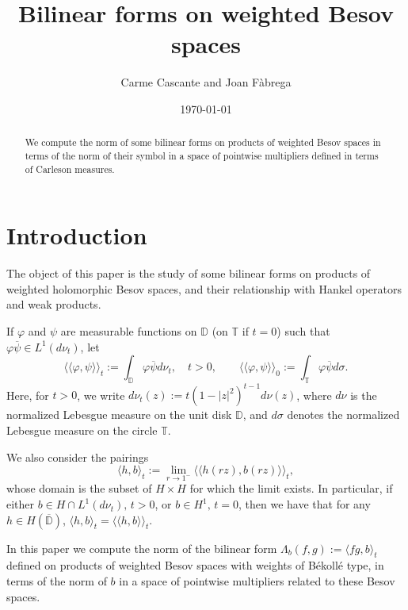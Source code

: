 \documentclass[12pt,twoside,leqno,final]{amsart}
\title{Bilinear forms on  weighted Besov spaces}
\author{Carme Cascante and Joan F\`abrega}
\date{\today}
\theoremstyle{plain}
\begin{document}
\begin{abstract} 
We compute the norm of some bilinear forms on products of weighted Besov spaces 
in terms of the norm of their symbol in a space of pointwise multipliers 
defined in terms of Carleson measures.
\end{abstract}

\maketitle

\section{Introduction}\label{sec:intro}
The object of this paper is the study of some bilinear forms on products of 
weighted holomorphic Besov spaces, and their  relationship with Hankel operators and weak products.

If $\varphi$ and $\psi$ are measurable functions on ${{\mathbb D}}$ (on ${{\mathbb T}}$ if $t=0$) 
such that $\varphi\overline{\psi}\in L^1(d\nu_t)$, let 
\begin{equation}\label{eqn:pars}
\langle\langle \varphi,\psi\rangle\rangle_t
:=\int_{{\mathbb D}} \varphi\overline \psi d\nu_t,\quad t>0,\qquad \langle\langle
 \varphi,\psi\rangle\rangle_0
:=\int_{{\mathbb T}} \varphi\overline \psi d\sigma.
\end{equation}
Here, for $t>0$, we write $d\nu_t(z):= t (1-|z|^2)^{t-1}d\nu(z)$, where $d\nu$ is 
the normalized Lebesgue measure on the unit disk ${{\mathbb D}}$, and $d\sigma$ 
denotes the normalized Lebesgue measure on the circle ${{\mathbb T}}$.

We also consider the pairings 
\begin{equation}\label{eqn:parw}
\langle h,b\rangle_t:=\lim_{r\to 1^{-}}\langle\langle h(rz), b(rz)\rangle\rangle_t,
\end{equation}
whose domain is the subset of $H\times H$ for which the limit exists.
In particular, if either $b\in H\cap L^1(d\nu_t),\,t>0$, or $b\in H^1,\,t=0$, then we have that for any $h\in H(\overline{{\mathbb D}})$, 
$\langle h,b\rangle_t=\langle\langle h,b\rangle\rangle_t$.

In this paper we compute the norm of the bilinear form $\Lambda_b(f,g):=\langle fg,b\rangle_t$  
defined on products of weighted Besov spaces with weights of B\'ekoll\'e type,
in terms of the norm of $b$ in a space of pointwise multipliers related to these Besov spaces.
\end{document}
